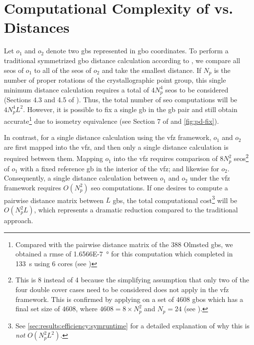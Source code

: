 \documentclass[preprint,12pt]{elsarticle}
\begin{document}
\section{Computational Complexity of  vs.  Distances } \label{sec:computational-complexity}
Let $o_1$ and $o_2$ denote two \glspl{gb} represented in \gls{gbo} coordinates. 
To perform a traditional symmetrized \gls{gbo} distance calculation according to \citet{francisGeodesicOctonionMetric2019}, we compare all \glspl{seo} of $o_1$ to all of the \glspl{seo} of $o_2$ and take the smallest distance. If $N_p$ is the number of proper rotations of the crystallographic point group, this single minimum distance calculation requires a total of $4N_p^4$ \glspl{seo} to be considered (Sections 4.3 and 4.5 of \citet{francisGeodesicOctonionMetric2019}). Thus, the total number of \gls{seo} computations will be $4N_p^4L^2$. However, it is possible to fix a single \gls{gb} in the \gls{gb} pair and still obtain accurate\footnote{Compared with the pairwise distance matrix of the 388 Olmsted \glspl{gb}, we obtained a \gls{rmse} of \SI{1.6566E-7}{\degree} for this computation which completed in \SI{133}{\s} using 6 cores (see )} due to isometry equivalence (see Section 7 of \cite{morawiecDistancesGrainInterfaces2019} and \cref{fig:pd-fix}).

In contrast, for a single distance calculation using the \gls{vfz} framework, $o_1$ and $o_2$ are first mapped into the \gls{vfz}, and then only a single distance calculation is required between them. Mapping $o_1$ into the \gls{vfz} requires comparison of $8N_p^2$ \glspl{seo}\footnote{This is 8 instead of 4 because the simplifying assumption that only two of the four double cover cases need to be considered \cite{francisGeodesicOctonionMetric2019} does not apply in the \gls{vfz} framework. This is confirmed by applying  on a set of $4608$ \glspl{gbo} which has a final set size of $4608$, where $4608=8\times N_p^2$ and $N_p=24$ (see ).} of $o_1$ with a fixed reference \gls{gb} in the interior of the \gls{vfz}; and likewise for $o_2$. Consequently, a single distance calculation between $o_1$ and $o_2$ under the \gls{vfz} framework requires $O(N_p^2)$ \gls{seo} computations. If one desires to compute a pairwise distance matrix between $L$ \glspl{gb}, the total computational cost\footnote{See \cref{sec:results:efficiency:symruntime} for a detailed explanation of why this is \emph{not} $O(N_p^2L^2)$.} will be $O(N_p^2L)$, which represents a dramatic reduction compared to the traditional approach.
\end{document}
